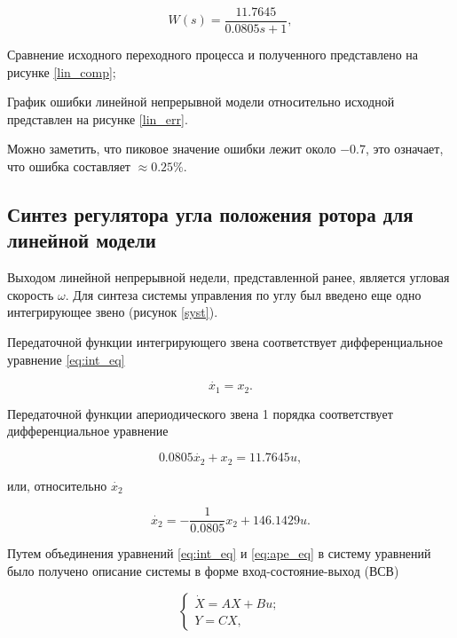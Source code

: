 \begin{equation}
  W(s)=\frac{11.7645}{0.0805s+1},
  \label{eq:lin_dbm}
\end{equation}

Сравнение исходного переходного процесса и полученного представлено на рисунке \ref{lin_comp};

\clearpage


График ошибки линейной непрерывной модели относительно исходной представлен на рисунке \ref{lin_err}.


Можно заметить, что пиковое значение ошибки лежит около $-0.7$, это означает, что ошибка составляет
$\approx0.25\%$.

\subsection{Синтез регулятора угла положения ротора для линейной модели}

Выходом линейной непрерывной недели, представленной ранее, является угловая скорость $\omega$.
Для синтеза системы управления по углу был введено еще одно интегрирующее 
звено (рисунок \ref{syst}).


Передаточной функции интегрирующего звена соответствует дифференциальное уравнение \ref{eq:int_eq}

\begin{equation}
  \dot{x_1}=x_2.
  \label{eq:int_eq}
\end{equation}

Передаточной функции апериодического звена 1 порядка соответствует дифференциальное уравнение

$$
  0.0805\dot{x_2} + x_2 = 11.7645u,
$$

или, относительно $\dot{x_2}$

\begin{equation}
  \dot{x_2}=-\frac{1}{0.0805}x_2+146.1429u.
  \label{eq:ape_eq}
\end{equation}

Путем объединения уравнений \ref{eq:int_eq} и \ref{eq:ape_eq} в систему уравнений было получено
описание системы в форме вход-состояние-выход (ВСВ)

$$
  \begin{cases}
    \dot{X}=AX+Bu;
    \\
    Y=CX,
  \end{cases}
$$\\


